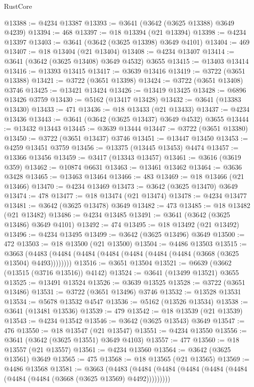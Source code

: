 \begin{lexlean}{RustCore}
\begin{coremodule}
@13388 := @4234 @13387
@13393 := @3641 (@3642 (@3625 @13388) @3649 @4239)
@13394 := 468
@13397 := @18 @13394 (@21 @13394)
@13398 := @4234 @13397
@13403 := @3641 (@3642 (@3625 @13398) @3649 @4101)
@13404 := 469
@13407 := @18 @13404 (@21 @13404)
@13408 := @4234 @13407
@13414 := @3641 (@3642 (@3625 @13408) @3649 @4532) @3655
@13415 := @13403 @13414
@13416 := @13393 @13415
@13417 := @3639 @13416
@13419 := @3722 (@3651 @13388)
@13421 := @3722 (@3651 @13398)
@13424 := @3722 (@3651 @13408) @3746
@13425 := @13421 @13424
@13426 := @13419 @13425
@13428 := @6896 @13426 @3759
@13430 := @5162 (@13417 @13428)
@13432 := @3641 (@13383 @13430)
@13433 := 471
@13436 := @18 @13433 (@21 @13433)
@13437 := @4234 @13436
@13443 := @3641 (@3642 (@3625 @13437) @3649 @4532) @3655
@13444 := @13432 @13443
@13445 := @3639 @13444
@13447 := @3722 (@3651 @13380)
@13450 := @3722 (@3651 @13437) @3746
@13451 := @13447 @13450
@13453 := @4259 @13451 @3759
@13456 := @13375 (@13445 @13453) @4474
@13457 := @13366 @13456
@13459 := @3417 (@13343 @13457)
@13461 := @3616 (@3619 @359)
@13462 := @10874 @6631
@13463 := @13461 @13462
@13464 := @3636 @3428
@13465 := @13463 @13464
@13466 := 483
@13469 := @18 @13466 (@21 @13466)
@13470 := @4234 @13469
@13473 := @3642 (@3625 @13470) @3649
@13474 := 478
@13477 := @18 @13474 (@21 @13474)
@13478 := @4234 @13477
@13481 := @3642 (@3625 @13478) @3649
@13482 := 473
@13485 := @18 @13482 (@21 @13482)
@13486 := @4234 @13485
@13491 := @3641 (@3642 (@3625 @13486) @3649 @4101)
@13492 := 474
@13495 := @18 @13492 (@21 @13492)
@13496 := @4234 @13495
@13499 := @3642 (@3625 @13496) @3649
@13500 := 472
@13503 := @18 @13500 (@21 @13500)
@13504 := @4486 @13503
@13515 := @3663 (@4483 (@4484 (@4484 (@4484 (@4484 (@4484 (@4484 (@3668 (@3625 @13504) @4493))))))))
@13516 := @3651 @13504
@13521 := @6639 (@3662 (@13515 (@3716 @13516)) @4142)
@13524 := @3641 (@13499 @13521) @3655
@13525 := @13491 @13524
@13526 := @3639 @13525
@13528 := @3722 (@3651 @13486)
@13531 := @3722 (@3651 @13496) @3746
@13532 := @13528 @13531
@13534 := @5678 @13532 @4547
@13536 := @5162 (@13526 @13534)
@13538 := @3641 (@13481 @13536)
@13539 := 479
@13542 := @18 @13539 (@21 @13539)
@13543 := @4234 @13542
@13546 := @3642 (@3625 @13543) @3649
@13547 := 476
@13550 := @18 @13547 (@21 @13547)
@13551 := @4234 @13550
@13556 := @3641 (@3642 (@3625 @13551) @3649 @4103)
@13557 := 477
@13560 := @18 @13557 (@21 @13557)
@13561 := @4234 @13560
@13564 := @3642 (@3625 @13561) @3649
@13565 := 475
@13568 := @18 @13565 (@21 @13565)
@13569 := @4486 @13568
@13581 := @3663
    (@4483 (@4484 (@4484 (@4484 (@4484 (@4484 (@4484 (@4484 (@3668 (@3625 @13569) @4492)))))))))

\end{coremodule}
\end{lexlean}
